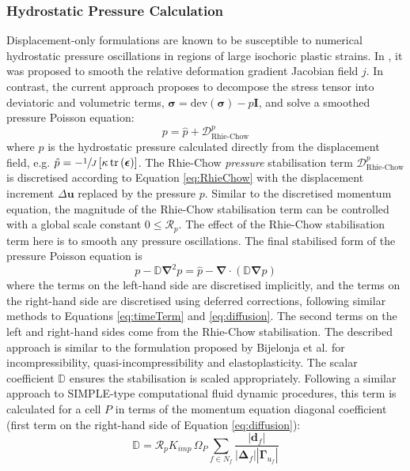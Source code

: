 \documentclass[sn-mathphys,Numbered]{sn-jnl}%
\newcommand{\bb}{\boldsymbol}
\begin{document}
\subsubsection{Hydrostatic Pressure Calculation} \label{sec:pressureApproach}
Displacement-only formulations are known to be susceptible to numerical hydrostatic pressure oscillations in regions of large isochoric plastic strains.
In \citet{cardiff_lagrangian_2017}, it was proposed to smooth the relative deformation gradient Jacobian field $j$.
In contrast, the current approach proposes to decompose the stress tensor into deviatoric and volumetric terms, $\bb{\sigma} = \text{dev}(\bb{\sigma}) - p \textbf{I}$, and solve a smoothed pressure Poisson equation:
\begin{equation}
	p = \hat{p} + \mathcal{D}_{\text{Rhie-Chow}}^p
\end{equation}
where $\hat{p}$ is the hydrostatic pressure calculated directly from the displacement field, e.g. $\hat{p} = -\sfrac{1}{J} \left[\kappa \, \text{tr}\left( \bb{\epsilon} \right)\right]$.
The Rhie-Chow \emph{pressure} stabilisation term $\mathcal{D}_{\text{Rhie-Chow}}^p$ is discretised according to Equation \ref{eq:RhieChow} with the displacement increment $\Delta \bb{u}$ replaced by the pressure $p$.
Similar to the discretised momentum equation, the magnitude of the Rhie-Chow stabilisation term can be controlled with a global scale constant $0 \leq \mathcal{R}_p$.
The effect of the Rhie-Chow stabilisation term here is to smooth any pressure oscillations.
The final stabilised form of the pressure Poisson equation is 
\begin{equation} \label{eq:pressureEqn}
	p - \mathbb{D} \bb{\nabla}^2 p = \hat{p} - \bb{\nabla} \cdot \left( \mathbb{D} \bb{\nabla} p \right)
\end{equation}
where the terms on the left-hand side are discretised implicitly, and the terms on the right-hand side are discretised using deferred corrections, following similar methods to Equations \ref{eq:timeTerm} and \ref{eq:diffusion}.
The second terms on the left and right-hand sides come from the Rhie-Chow stabilisation.
The described approach is similar to the formulation proposed by Bijelonja et al. \cite{Bijelonja2002, Bijelonja2005a, Bijelonja2005b, Bijelonja2006} for incompressibility, quasi-incompressibility and elastoplasticity.
The scalar coefficient $\mathbb{D}$ ensures the stabilisation is scaled appropriately. Following a similar approach to SIMPLE-type computational fluid dynamic procedures, this term is calculated for a cell $P$ in terms of the momentum equation diagonal coefficient (first term on the right-hand side of Equation \ref{eq:diffusion}):
\begin{equation}
	\mathbb{D} = \mathcal{R}_p K_{imp} \, \Omega_P \sum_{f \in N_f} 
	 \frac{\left|\boldsymbol{d}_f\right|}{\left|\boldsymbol{\Delta}_f\right| \left|\bb{\Gamma}_{u_f}\right| }
\end{equation}
\end{document}
